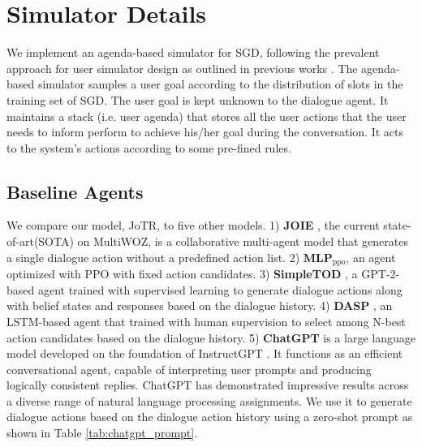 \documentclass[letterpaper]{article} %
\begin{document}
\section{Simulator Details}
We implement an agenda-based simulator for SGD, following the prevalent approach for user simulator design as outlined in previous works \cite{schatzmann_agenda-based_2007,wang-wong-2021-collaborative, kwan2023survey}. The agenda-based simulator samples a user goal according to the distribution of slots in the training set of SGD. The user goal is kept unknown to the dialogue agent.
It maintains a stack (i.e. user agenda) that stores all the user actions that the user needs to inform perform to achieve his/her goal during the conversation. It acts to the system's actions according to some pre-fined rules.

\subsection{Baseline Agents}
We compare our model, JoTR, to five other models. 1) \textbf{JOIE} \citep{wang-wong-2021-collaborative}, the current state-of-art(SOTA) on MultiWOZ, is a collaborative multi-agent model that generates a single dialogue action without a predefined action list. 2) \textbf{MLP$_{\text{ppo}}$}, an agent optimized with PPO with fixed action candidates. 3) \textbf{SimpleTOD} \citep{hosseini-asl_simple_2020}, a GPT-2-based agent trained with supervised learning to generate dialogue actions along with belief states and responses based on the dialogue history. 4) \textbf{DASP} \citep{jhunjhunwala-etal-2020-multi}, an LSTM-based agent that trained with human supervision to select among N-best action candidates based on the dialogue history. 5) \textbf{ChatGPT} is a large language model developed on the foundation of InstructGPT \cite{ouyang2022training}. It functions as an efficient conversational agent, capable of interpreting user prompts and producing logically consistent replies. ChatGPT has demonstrated impressive results across a diverse range of natural language processing assignments. We use it to generate dialogue actions based on the dialogue action history using a zero-shot prompt as shown in Table \ref{tab:chatgpt_prompt}. 
\end{document}
